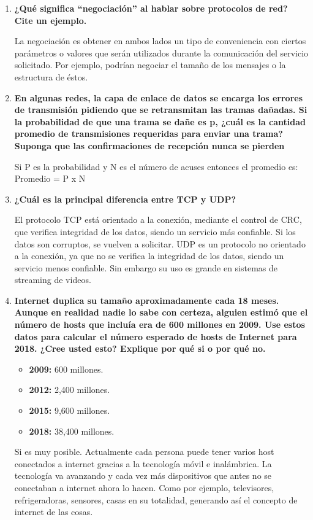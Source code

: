 \documentclass[a4paper,12pt]{article}
\begin{document}
\begin{enumerate}
 \item \textbf{¿Qué significa ``negociación'' al hablar sobre protocolos de red? Cite un ejemplo.}
 
La negociación es obtener en ambos lados un tipo de conveniencia con ciertos parámetros o valores que serán utilizados
durante la comunicación del servicio solicitado. Por ejemplo, podrían negociar el tamaño de los mensajes o la estructura de
éstos.

 \item \textbf{En algunas redes, la capa de enlace de datos se encarga los errores de transmisión pidiendo que se retransmitan
las tramas dañadas. Si la probabilidad de que una trama se dañe es p, ¿cuál es la cantidad promedio de transmisiones
requeridas para enviar una trama? Suponga que las confirmaciones de recepción nunca se pierden}

Si P es la probabilidad y N es el número de acuses entonces el promedio es: Promedio = P x N

 \item \textbf{¿Cuál es la principal diferencia entre TCP y UDP?}
 
 El protocolo TCP está orientado a la conexión, mediante el control de CRC, que verifica integridad de los datos,
 siendo un servicio más confiable. Si los datos son corruptos, se vuelven a solicitar. UDP es un protocolo no orientado a la conexión, ya que no se
 verifica la integridad de los datos, siendo un servicio menos confiable. Sin embargo su uso es grande en sistemas de streaming de videos.
 
 \item \textbf{Internet duplica su tamaño aproximadamente cada 18 meses. Aunque en realidad nadie lo sabe con certeza,
alguien estimó que el número de hosts que incluía era de 600 millones en 2009. Use estos datos para calcular el
número esperado de hosts de Internet para 2018. ¿Cree usted esto? Explique por qué si o por qué no.}

\begin{itemize}
 \item \textbf{2009:} 600 millones.
 \item \textbf{2012:} 2,400 millones.
 \item \textbf{2015:} 9,600 millones.
 \item \textbf{2018:} 38,400 millones.
\end{itemize}

Si es muy posible. Actualmente cada persona puede tener varios host conectados a internet gracias a la tecnología móvil e inalámbrica.
La tecnología va avanzando y cada vez más dispositivos que antes no se conectaban a internet ahora lo hacen. Como por ejemplo, televisores, refrigeradoras,
sensores, casas en su totalidad, generando así el concepto de internet de las cosas.


\end{enumerate}
\end{document}
